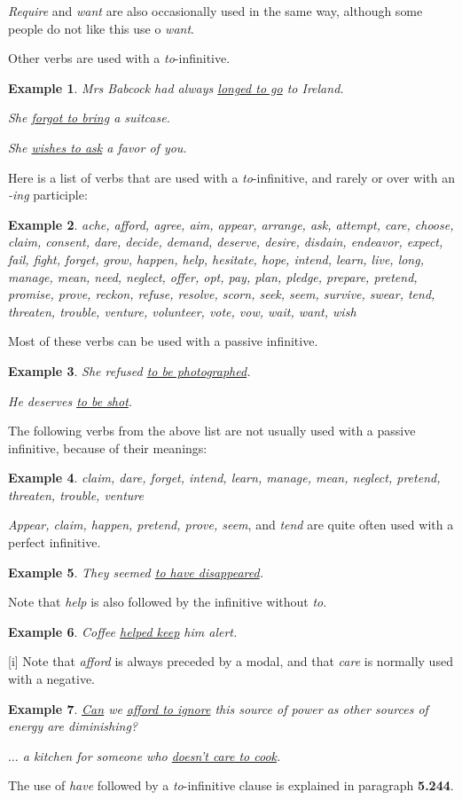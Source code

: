 \documentclass[oneside]{book}
\numberwithin{equation}{section}
\newtheorem{example}{Example}[section]
\begin{document}
%
\textit{Require} and \textit{want} are also occasionally used in the same way, although some people do not like this use o \textit{want}.

%
\noindent{} Other verbs are used with a \textit{to}-infinitive.
\begin{example}
    Mrs Babcock had always \underline{longed to go} to Ireland.
    
    She \underline{forgot to bring} a suitcase.
    
    She \underline{wishes to ask} a favor of you.
\end{example}
Here is a list of verbs that are used with a \textit{to}-infinitive, and rarely or over with an \textit{-ing} participle:
\begin{example}
    ache, afford, agree, aim, appear, arrange, ask, attempt, care, choose, claim, consent, dare, decide, demand, deserve, desire, disdain, endeavor, expect, fail, fight, forget, grow, happen, help, hesitate, hope, intend, learn, live, long, manage, mean, need, neglect, offer, opt, pay, plan, pledge, prepare, pretend, promise, prove, reckon, refuse, resolve, scorn, seek, seem, survive, swear, tend, threaten, trouble, venture, volunteer, vote, vow, wait, want, wish
\end{example}
Most of these verbs can be used with a passive infinitive.
\begin{example}
    She refused \underline{to be photographed}.
    
    He deserves \underline{to be shot}.
\end{example}
The following verbs from the above list are not usually used with a passive infinitive, because of their meanings:
\begin{example}
    claim, dare, forget, intend, learn, manage, mean, neglect, pretend, threaten, trouble, venture
\end{example}
\textit{Appear, claim, happen, pretend, prove, seem}, and \textit{tend} are quite often used with a perfect infinitive.
\begin{example}
    They seemed \underline{to have disappeared}.
\end{example}
Note that \textit{help} is also followed by the infinitive without \textit{to}.
\begin{example}
    Coffee \underline{helped keep} him alert.
\end{example}
%
\noindent{} [i] Note that \textit{afford} is always preceded by a modal, and that \textit{care} is normally used with a negative.
\begin{example}
    \underline{Can} we \underline{afford to ignore} this source of power as other sources of energy are diminishing?
    
    $\ldots$ a kitchen for someone who \underline{doesn't care to cook}.
\end{example}
%
\noindent{} The use of \textit{have} followed by a \textit{to}-infinitive clause is explained in paragraph \textbf{5.244}.
\end{document}
